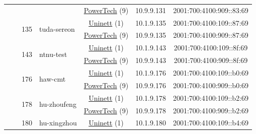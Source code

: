 \begin{small}
\begin{center}
\begin{longtable}{|c|c|c|c|c|c|c|c|}
  &  &  &  & \multicolumn{2}{|c|}{\tiny{\href{http://www.powertech.no}{PowerTech} (9)}} & \tiny{10.9.9.131} & \tiny{2001:700:4100:909::83:69} \\* \cline{3-3}\cline{4-4}\cline{5-5}\cline{6-6}\cline{7-7}\cline{8-8}
  &  & \multirow{2}{*}{\tiny{135}} & \multicolumn{1}{|l|}{\multirow{2}{*}{\tiny{tuda-sereon}}} & \multicolumn{2}{|c|}{\tiny{\href{https://www.uninett.no}{Uninett} (1)}} & \tiny{10.1.9.135} & \tiny{2001:700:4100:109::87:69} \\* \cline{5-5}\cline{6-6}\cline{7-7}\cline{8-8}
  &  &  &  & \multicolumn{2}{|c|}{\tiny{\href{http://www.powertech.no}{PowerTech} (9)}} & \tiny{10.9.9.135} & \tiny{2001:700:4100:909::87:69} \\* \cline{3-3}\cline{4-4}\cline{5-5}\cline{6-6}\cline{7-7}\cline{8-8}
  &  & \multirow{2}{*}{\tiny{143}} & \multicolumn{1}{|l|}{\multirow{2}{*}{\tiny{ntnu-test}}} & \multicolumn{2}{|c|}{\tiny{\href{https://www.uninett.no}{Uninett} (1)}} & \tiny{10.1.9.143} & \tiny{2001:700:4100:109::8f:69} \\* \cline{5-5}\cline{6-6}\cline{7-7}\cline{8-8}
  &  &  &  & \multicolumn{2}{|c|}{\tiny{\href{http://www.powertech.no}{PowerTech} (9)}} & \tiny{10.9.9.143} & \tiny{2001:700:4100:909::8f:69} \\* \cline{3-3}\cline{4-4}\cline{5-5}\cline{6-6}\cline{7-7}\cline{8-8}
  &  & \multirow{2}{*}{\tiny{176}} & \multicolumn{1}{|l|}{\multirow{2}{*}{\tiny{haw-cmt}}} & \multicolumn{2}{|c|}{\tiny{\href{https://www.uninett.no}{Uninett} (1)}} & \tiny{10.1.9.176} & \tiny{2001:700:4100:109::b0:69} \\* \cline{5-5}\cline{6-6}\cline{7-7}\cline{8-8}
  &  &  &  & \multicolumn{2}{|c|}{\tiny{\href{http://www.powertech.no}{PowerTech} (9)}} & \tiny{10.9.9.176} & \tiny{2001:700:4100:909::b0:69} \\* \cline{3-3}\cline{4-4}\cline{5-5}\cline{6-6}\cline{7-7}\cline{8-8}
  &  & \multirow{2}{*}{\tiny{178}} & \multicolumn{1}{|l|}{\multirow{2}{*}{\tiny{hu-zhoufeng}}} & \multicolumn{2}{|c|}{\tiny{\href{https://www.uninett.no}{Uninett} (1)}} & \tiny{10.1.9.178} & \tiny{2001:700:4100:109::b2:69} \\* \cline{5-5}\cline{6-6}\cline{7-7}\cline{8-8}
  &  &  &  & \multicolumn{2}{|c|}{\tiny{\href{http://www.powertech.no}{PowerTech} (9)}} & \tiny{10.9.9.178} & \tiny{2001:700:4100:909::b2:69} \\* \cline{3-3}\cline{4-4}\cline{5-5}\cline{6-6}\cline{7-7}\cline{8-8}
  &  & \multirow{2}{*}{\tiny{180}} & \multicolumn{1}{|l|}{\multirow{2}{*}{\tiny{hu-xingzhou}}} & \multicolumn{2}{|c|}{\tiny{\href{https://www.uninett.no}{Uninett} (1)}} & \tiny{10.1.9.180} & \tiny{2001:700:4100:109::b4:69} \\* \cline{5-5}\cline{6-6}\cline{7-7}\cline{8-8}

\end{longtable}
\end{center}
\end{small}
